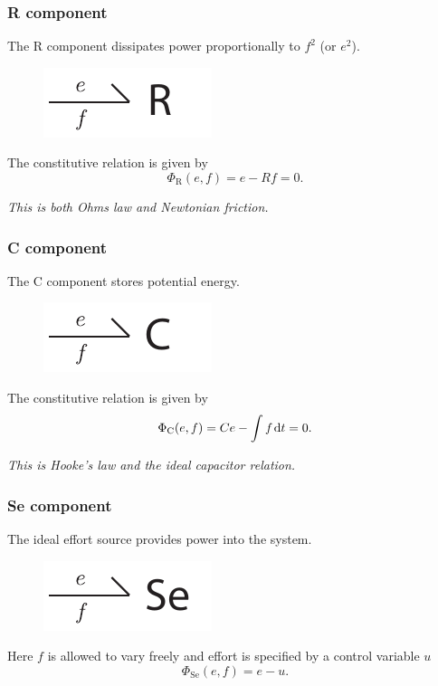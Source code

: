 \begin{frame}
\frametitle{R component}
The R component dissipates power proportionally to $f^2$ (or $e^2$).
\begin{figure}
	\includegraphics{oneport-R.pdf}
\end{figure}
The constitutive relation is given by
\[
\Phi_\text{R}(e,f) = e - Rf = 0.
\]
\vspace{10pt}

\begin{center}
\emph{This is both Ohms law and Newtonian friction.}
\end{center}
\end{frame}
\begin{frame}
\frametitle{C component}
The C component stores potential energy.
\begin{figure}
	\includegraphics{oneport-C.pdf}
\end{figure}
The constitutive relation is given by
\[
\Phi_\text{C}(e,f) = Ce - \int f \mspace{2mu} \mathrm{d}t = 0.
\]
\vspace{10pt}

\begin{center}
\emph{This is Hooke's law and the ideal capacitor relation.}
\end{center}
\end{frame}
\begin{frame}
\frametitle{Se component}
The ideal effort source provides power into the system.
\begin{figure}
\includegraphics{oneport-Se.pdf}
\end{figure}
Here $f$ is allowed to vary freely and effort is specified by a control variable $u$
\[
\Phi_\text{Se}(e,f) = e - u.
\]

\end{frame}
